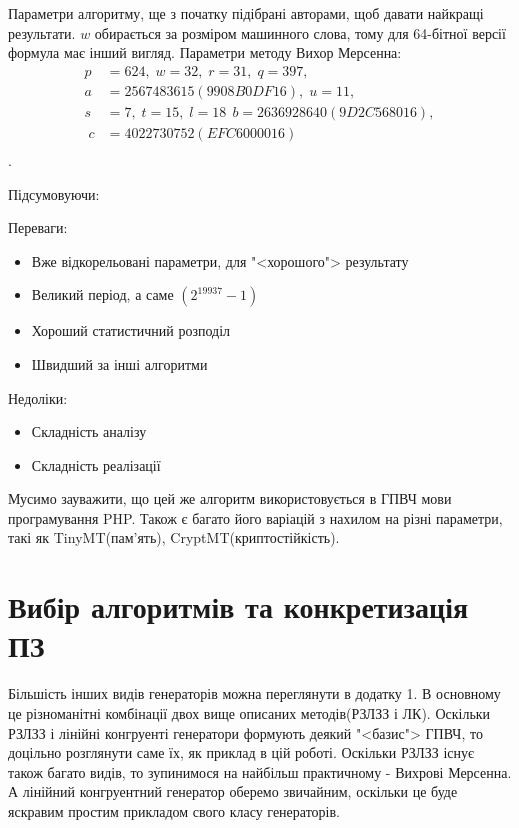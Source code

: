 \documentclass[oneside,final,14pt]{extreport}
\begin{document}
\begin{large}
\begin{enumerate}
		Параметри алгоритму, ще з початку підібрані авторами, щоб давати найкращі 
		результати. $w$ обирається за розміром машинного слова, тому для 64-бітної версії 
		формула має інший вигляд.
		Параметри методу Вихор Мерсенна:
	\begin{displaymath}
		\begin{split}
		p &= 624,\; w = 32,\; r = 31,\; q = 397,\; \\
		a &= 2567483615(9908B0DF16),\; u = 11,\; \\
		s &= 7,\; t = 15,\; l =18\,\; b = 2636928640(9D2C568016),\\
		\; c &= 4022730752(EFC6000016) \\
		\end{split}
	\end{displaymath}. 	
	
\end{enumerate}
\newpage
Підсумовуючи:

Переваги:
\begin{itemize}
	\item Вже відкорельовані параметри, для "<хорошого"> результату
	\item Великий період, а саме $(2^{19937}-1)$
	\item Хороший статистичний розподіл
	\item Швидший за інші алгоритми
	
\end{itemize}

Недоліки:
\begin{itemize}
	\item Складність аналізу
	\item Складність реалізації
\end{itemize}

Мусимо зауважити, що цей же алгоритм використовується в ГПВЧ мови програмування PHP. 
Також є багато його варіацій з нахилом на різні параметри, такі як TinyMT(пам'ять), CryptMT(криптостійкість).

\section{Вибір алгоритмів та конкретизація ПЗ}\label{s:24}

Більшість інших видів генераторів можна переглянути в додатку 1. В основному це різноманітні 
комбінації двох вище описаних методів(РЗЛЗЗ і ЛК). Оскільки РЗЛЗЗ і лінійні конгруенті генератори 
формують деякий "<базис"> ГПВЧ, то доцільно розглянути саме їх, як приклад в цій роботі. Оскільки 
РЗЛЗЗ існує також багато видів, то зупинимося на найбільш практичному - Вихрові Мерсенна. А лінійний 
конгруентний генератор оберемо звичайним, оскільки це буде яскравим простим прикладом свого класу генераторів.


\end{large}
\end{document}
